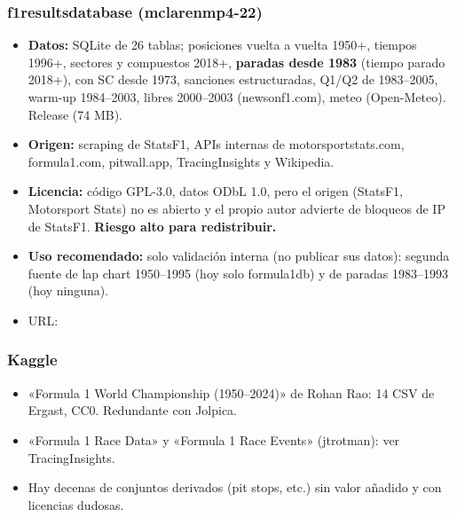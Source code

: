 \subsubsection{f1resultsdatabase (mclarenmp4-22)}

\begin{itemize}
\item \textbf{Datos:} SQLite de 26 tablas; posiciones vuelta a vuelta 1950+, tiempos 1996+, sectores y compuestos 2018+, \textbf{paradas desde 1983} (tiempo parado 2018+),  con SC desde 1973, sanciones estructuradas, Q1/Q2 de 1983–2005, warm-up 1984–2003, libres 2000–2003 (newsonf1.com), meteo (Open-Meteo). Release  (74 MB).
\item \textbf{Origen:} scraping de StatsF1, APIs internas de motorsportstats.com, formula1.com, pitwall.app, TracingInsights y Wikipedia.
\item \textbf{Licencia:} código GPL-3.0, datos ODbL 1.0, pero el origen (StatsF1, Motorsport Stats) no es abierto y el propio autor advierte de bloqueos de IP de StatsF1. \textbf{Riesgo alto para redistribuir.}
\item \textbf{Uso recomendado:} solo validación interna (no publicar sus datos): segunda fuente de lap chart 1950–1995 (hoy solo formula1db) y de paradas 1983–1993 (hoy ninguna).
\item URL: \href{https://github.com/mclarenmp4-22/f1resultsdatabase}{}
\end{itemize}

\subsubsection{Kaggle}

\begin{itemize}
\item «Formula 1 World Championship (1950–2024)» de Rohan Rao: 14 CSV de Ergast, CC0. Redundante con Jolpica. \href{https://www.kaggle.com/datasets/rohanrao/formula-1-world-championship-1950-2020}{}
\item «Formula 1 Race Data» y «Formula 1 Race Events» (jtrotman): ver TracingInsights. \href{https://www.kaggle.com/datasets/jtrotman/formula-1-race-events}{}
\item Hay decenas de conjuntos derivados (pit stops, etc.) sin valor añadido y con licencias dudosas.
\end{itemize}

